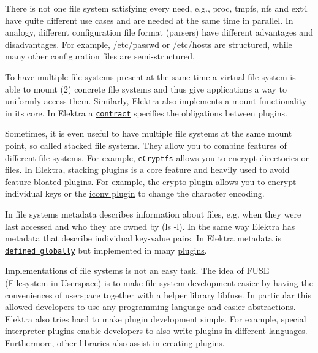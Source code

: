 There is not one file system satisfying every need, e.\+g., {\ttfamily proc}, {\ttfamily tmpfs}, {\ttfamily nfs} and {\ttfamily ext4} have quite different use cases and are needed at the same time in parallel. In analogy, different configuration file format (parsers) have different advantages and disadvantages. For example, {\ttfamily /etc/passwd} or {\ttfamily /etc/hosts} are structured, while many other configuration files are semi-\/structured.

To have multiple file systems present at the same time a virtual file system is able to {\ttfamily mount (2)} concrete file systems and thus give applications a way to uniformly access them. Similarly, Elektra also implements a \hyperlink{doc_help_elektra-mounting_md}{mount} functionality in its core. In Elektra a \href{/home/jenkins/workspace/libelektra-release/doc/CONTRACT.ini}{\tt contract} specifies the obligations between plugins.

Sometimes, it is even useful to have multiple file systems at the same mount point, so called {\ttfamily stacked} file systems. They allow you to combine features of different file systems. For example, \href{https://wiki.archlinux.org/index.php/ECryptfs}{\tt e\+Cryptfs} allows you to encrypt directories or files. In Elektra, stacking plugins is a core feature and heavily used to avoid feature-\/bloated plugins. For example, the \hyperlink{autotoc_md109_src_plugins_crypto_README_md}{crypto plugin} allows you to encrypt individual keys or the \hyperlink{autotoc_md283_src_plugins_iconv_README_md}{iconv plugin} to change the character encoding.

In file systems metadata describes information about files, e.\+g. when they were last accessed and who they are owned by ({\ttfamily ls -\/l}). In the same way Elektra has metadata that describe individual key-\/value pairs. In Elektra metadata is \href{/home/jenkins/workspace/libelektra-release/doc/METADATA.ini}{\tt defined globally} but implemented in many \hyperlink{src_plugins_README_md}{plugins}.

Implementations of file systems is not an easy task. The idea of F\+U\+SE (Filesystem in Userspace) is to make file system development easier by having the conveniences of userspace together with a helper library {\ttfamily libfuse}. In particular this allowed developers to use any programming language and easier abstractions. Elektra also tries hard to make plugin development simple. For example, special \hyperlink{src_plugins_README_md}{interpreter plugins} enable developers to also write plugins in different languages. Furthermore, \hyperlink{src_libs_README_md}{other libraries} also assist in creating plugins.

